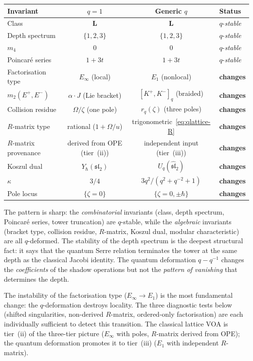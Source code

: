 \begin{conjecture}
\begin{center}
\small
\renewcommand{\arraystretch}{1.3}
\begin{tabular}{lccl}
\toprule
\textbf{Invariant} & \textbf{$q = 1$}
 & \textbf{Generic $q$} & \textbf{Status} \\
\midrule
Class & $\mathbf{L}$ & $\mathbf{L}$
 & $q$-\emph{stable} \\
Depth spectrum & $\{1,2,3\}$ & $\{1,2,3\}$
 & $q$-\emph{stable} \\
$m_4$ & $0$ & $0$
 & $q$-\emph{stable} \\
Poincar\'{e} series & $1 + 3t$ & $1 + 3t$
 & $q$-\emph{stable} \\
Factorisation type & $E_\infty$ (local)
 & $E_1$ (nonlocal)
 & \textbf{changes} \\
$m_2(E^+,E^-)$ & $\alpha\cdot J$ (Lie bracket)
 & $[K^+,K^-]_q$ (braided)
 & \textbf{changes} \\
Collision residue & $\Omega/\zeta$ (one pole)
 & $r_q(\zeta)$ (three poles)
 & \textbf{changes} \\
$R$-matrix type & rational ($1 + \Omega/u$)
 & trigonometric~\eqref{eq:qlattice-R}
 & \textbf{changes} \\
$R$-matrix provenance & derived from OPE (tier~(ii))
 & independent input (tier~(iii))
 & \textbf{changes} \\
Koszul dual & $Y_\hbar(\mathfrak{sl}_2)$
 & $U_q(\widehat{\mathfrak{sl}}_2)$
 & \textbf{changes} \\
$\kappa$ & $3/4$
 & $3q^2/(q^2+q^{-2}+1)$
 & \textbf{changes} \\
Pole locus & $\{\zeta = 0\}$
 & $\{\zeta = 0, \pm\hbar\}$
 & \textbf{changes} \\
\bottomrule
\end{tabular}
\end{center}
\noindent
The pattern is sharp: the \emph{combinatorial} invariants
(class, depth spectrum, Poincar\'{e} series, tower
truncation) are $q$-stable, while the \emph{algebraic}
invariants (bracket type, collision residue, $R$-matrix,
Koszul dual, modular characteristic) are all $q$-deformed.
The stability of the depth spectrum is the
deepest structural fact: it says that the quantum
Serre relation terminates the tower at the same depth
as the classical Jacobi identity. The quantum deformation
$q - q^{-1}$ changes the \emph{coefficients} of the
shadow operations but not the \emph{pattern of
vanishing} that determines the depth.

The instability of the factorisation type ($E_\infty \to E_1$)
is the most fundamental change: the $q$-deformation
destroys locality. The three diagnostic tests below
(shifted singularities, non-derived $R$-matrix, ordered-only
factorisation) are each individually sufficient to detect
this transition. The classical lattice VOA is tier~(ii)
of the three-tier picture ($E_\infty$ with poles, $R$-matrix
derived from OPE); the quantum deformation promotes it to
tier~(iii) ($E_1$ with independent $R$-matrix).


\end{conjecture}
